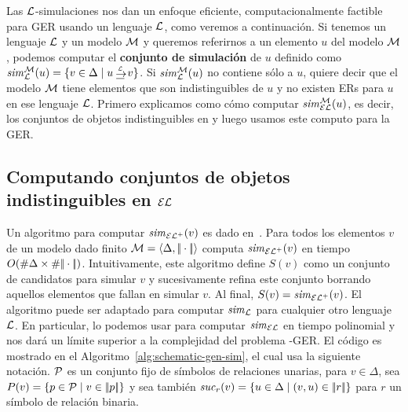 Las $\mathcal{L}$-simulaciones nos dan un enfoque eficiente, computacionalmente factible para GER usando un lenguaje $\mathcal{L}$, como veremos a continuaci\'on. Si tenemos un lenguaje $\mathcal{L}$ y un modelo $\mathcal{M}$ y queremos referirnos a un elemento $u$ del modelo $\mathcal{M}$, podemos computar el {\bf conjunto de simulaci\'on} de $u$ definido como
$\simset_{\+L}^{\+M}(u) = \cset{v \in \Delta \mid u \simul{\+L} v}$. Si ${\it sim}_{\mathcal{L}}^{\mathcal{M}}(u)$ no contiene s\'olo a $u$, quiere decir que el modelo $\mathcal{M}$ tiene elementos que son indistinguibles de $u$ y no existen ERs para $u$ en ese lenguaje $\mathcal{L}$.
Primero explicamos como c\'omo computar ${\it sim}_{\mathcal{EL}}^{\mathcal{M}}(u)$, es decir, los conjuntos de objetos indistinguibles en \EL y luego usamos este computo para la GER.
%

\subsection{Computando conjuntos de objetos indistinguibles en $\mathcal{EL}$}
\label{sec:indistinguiblesEL}

Un algoritmo para computar ${\it sim}_{{\mathcal{EL}^+}}(v)$ es dado en~\cite{HHK95}. Para todos los
elementos $v$ de un modelo dado finito
$\mathcal{M}=\langle \Delta,|\!|\cdot|\!| \rangle$
computa ${\it sim}_{{\mathcal{EL}^+}}(v)$ en tiempo $O(\# \Delta\times\# {|\!|\cdot|\!|})$.
Intuitivamente, este algoritmo
define $S(v)$ como un conjunto de candidatos para simular $v$ y
sucesivamente refina este conjunto borrando aquellos elementos que fallan en simular $v$.
Al final, $S(v)={\it sim}_{\mathcal{EL}^+}(v)$. El algoritmo puede ser adaptado para
computar ${\it sim}_{\mathcal{L}}$ para cualquier otro lenguaje $\mathcal{L}$. En particular,
lo podemos usar para computar ${\it sim}_\mathcal{EL}$ en tiempo polinomial y nos dar\'a un l\'imite superior a la
complejidad del problema \EL-GER. 
El c\'odigo es mostrado en el
Algoritmo~\ref{alg:schematic-gen-sim}, el cual usa la siguiente
notaci\'on. $\mathcal{P}$ es un conjunto fijo de s\'imbolos de relaciones unarias, para $v\in
\Delta$, sea $P(v)=\{p\in\mathcal{P}\mid v\in|\!|p|\!|\}$ y sea tambi\'en
${\it suc}_{r}(v)=\{u\in\Delta\mid(v,u)\in|\!|r|\!|\}$ para $r$ un s\'imbolo de relaci\'on binaria.\\


